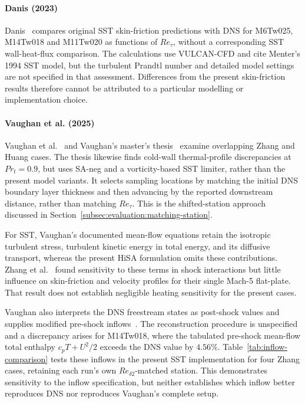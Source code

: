 \paragraph*{Danis (2023)}

Danis~\cite[Figure~4.10]{danis2023direct} compares original SST skin-friction predictions with DNS for M6Tw025, M14Tw018 and M11Tw020 as functions of \(Re_\tau\), without a corresponding SST wall-heat-flux comparison. The calculations use VULCAN-CFD and cite Menter's 1994 SST model, but the turbulent Prandtl number and detailed model settings are not specified in that assessment. Differences from the present skin-friction results therefore cannot be attributed to a particular modelling or implementation choice.

\paragraph*{Vaughan et al. (2025)}

Vaughan et al.~\cite{vaughan2025paper} and Vaughan's master's thesis~\cite{vaughan2025thesis} examine overlapping Zhang and Huang cases. The thesis likewise finds cold-wall thermal-profile discrepancies at \(Pr_t=0.9\), but uses SA-neg and a vorticity-based SST limiter, rather than the present model variants. It selects sampling locations by matching the initial DNS boundary layer thickness and then advancing by the reported downstream distance, rather than matching \(Re_\tau\). This is the shifted-station approach discussed in Section~\ref{subsec:evaluation:matching-station}.
\par\medskip

For SST, Vaughan's documented mean-flow equations retain the isotropic turbulent stress, turbulent kinetic energy in total energy, and its diffusive transport, whereas the present HiSA formulation omits these contributions. Zhang et al.~\cite{zhang2021formulation} found sensitivity to these terms in shock interactions but little influence on skin-friction and velocity profiles for their single Mach-5 flat-plate. That result does not establish negligible heating sensitivity for the present cases.
\par\medskip

Vaughan also interprets the DNS freestream states as post-shock values and supplies modified pre-shock inflows~\cite[Tables~2.2--2.3]{vaughan2025thesis}. The reconstruction procedure is unspecified and a discrepancy arises for M14Tw018, where the tabulated pre-shock mean-flow total enthalpy \(c_pT+U^2/2\) exceeds the DNS value by \(4.56\%\). Table~\ref{tab:inflow-comparison} tests these inflows in the present SST implementation for four Zhang cases, retaining each run's own \(Re_{\delta2}\)-matched station. This demonstrates sensitivity to the inflow specification, but neither establishes which inflow better reproduces DNS nor reproduces Vaughan's complete setup.

